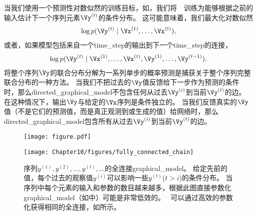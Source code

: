 当我们使用一个预测性对数似然的训练目标，如，我们将~~训练为能够根据之前的输入估计下一个序列元素$\Vy^{(t)}$的条件分布。
这可能意味着，我们最大化对数似然
\begin{align}
 \log p(\Vy^{(t)} \mid \Vx^{(1)},\dots, \Vx^{(t)}),
\end{align}
或者，如果模型包括来自一个\gls{time_step}的输出到下一个\gls{time_step}的连接，
\begin{align}
 \log p(\Vy^{(t)} \mid \Vx^{(1)},\dots, \Vx^{(t)},\Vy^{(1)},\dots, \Vy^{(t-1)} ).
\end{align}
将整个序列$\Vy$的联合分布分解为一系列单步的概率预测是捕获关于整个序列完整联合分布的一种方法。
当我们不把过去的$\Vy$值反馈给下一步作为预测的条件时，那么\gls{directed_graphical_model}不包含任何从过去$\Vy^{(i)}$到当前$\Vy^{(t)}$的边。
在这种情况下，输出$\Vy$与给定的$\Vx$序列是条件独立的。
当我们反馈真实的$\Vy$值（不是它们的预测值，而是真正观测到或生成的值）给网络时，那么\gls{directed_graphical_model}包含所有从过去$\Vy^{(i)}$到当前$\Vy^{(t)}$的边。
\begin{figure}[!htb]
\ifOpenSource
\centerline{\texttt{[image: figure.pdf]}}
\else
\centerline{\texttt{[image: Chapter10/figures/fully\_connected\_chain]}}
\fi
\caption{序列$y^{(1)},y^{(2)},\dots,y^{(t)},\dots$的全连接\gls{graphical_model}。
给定先前的值，每个过去的观察值$y^{(i)}$可以影响一些$y^{(t)}$($t>i$)的条件分布。
当序列中每个元素的输入和参数的数目越来越多，根据此图直接参数化\gls{graphical_model}（如中）可能是非常低效的。
~可以通过高效的参数化获得相同的全连接，如所示。
}
\label{fig:chap10_fully_connected_chain}
\end{figure}


